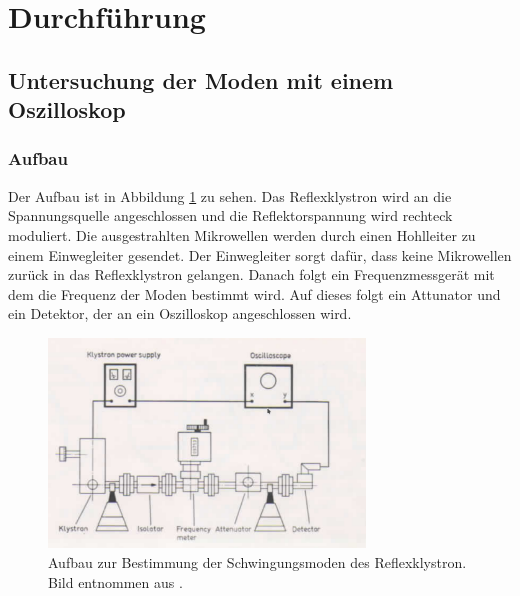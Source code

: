 \section{Durchführung}
\label{sec:Durchführung}

\subsection{Untersuchung der Moden mit einem Oszilloskop}
\subsubsection{Aufbau}
Der Aufbau ist in Abbildung \ref{fig:moden_aufbau} zu sehen.
Das Reflexklystron wird an die Spannungsquelle angeschlossen und die Reflektorspannung wird rechteck moduliert.
Die ausgestrahlten Mikrowellen werden durch einen Hohlleiter zu einem Einwegleiter gesendet.
Der Einwegleiter sorgt dafür, dass keine Mikrowellen zurück in das Reflexklystron gelangen.
Danach folgt ein Frequenzmessgerät mit dem die Frequenz der Moden bestimmt wird.
Auf dieses folgt ein Attunator und ein Detektor, der an ein Oszilloskop angeschlossen wird.

\begin{figure}
    \centering
    \includegraphics[width=0.75\textwidth]{content/data/Aufbau_Moden.png}
    \caption{Aufbau zur Bestimmung der Schwingungsmoden des Reflexklystron. Bild entnommen aus \cite[8]{Anleitung}.}
    \label{fig:moden_aufbau}
\end{figure}

